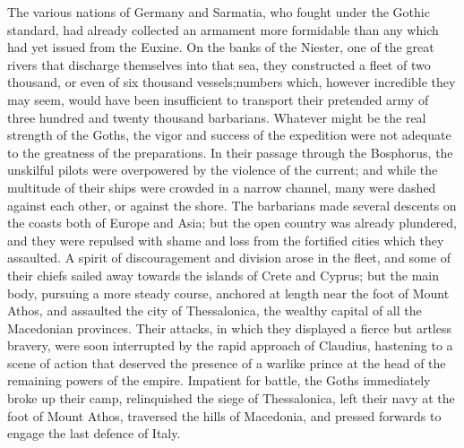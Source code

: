 
The various nations of Germany and Sarmatia, who fought under the
Gothic standard, had already collected an armament more
formidable than any which had yet issued from the Euxine. On the
banks of the Niester, one of the great rivers that discharge
themselves into that sea, they constructed a fleet of two
thousand, or even of six thousand vessels;\footnotemark[11] numbers which,
however incredible they may seem, would have been insufficient to
transport their pretended army of three hundred and twenty
thousand barbarians. Whatever might be the real strength of the
Goths, the vigor and success of the expedition were not adequate
to the greatness of the preparations. In their passage through
the Bosphorus, the unskilful pilots were overpowered by the
violence of the current; and while the multitude of their ships
were crowded in a narrow channel, many were dashed against each
other, or against the shore. The barbarians made several descents
on the coasts both of Europe and Asia; but the open country was
already plundered, and they were repulsed with shame and loss
from the fortified cities which they assaulted. A spirit of
discouragement and division arose in the fleet, and some of their
chiefs sailed away towards the islands of Crete and Cyprus; but
the main body, pursuing a more steady course, anchored at length
near the foot of Mount Athos, and assaulted the city of
Thessalonica, the wealthy capital of all the Macedonian
provinces. Their attacks, in which they displayed a fierce but
artless bravery, were soon interrupted by the rapid approach of
Claudius, hastening to a scene of action that deserved the
presence of a warlike prince at the head of the remaining powers
of the empire. Impatient for battle, the Goths immediately broke
up their camp, relinquished the siege of Thessalonica, left their
navy at the foot of Mount Athos, traversed the hills of
Macedonia, and pressed forwards to engage the last defence of
Italy.



